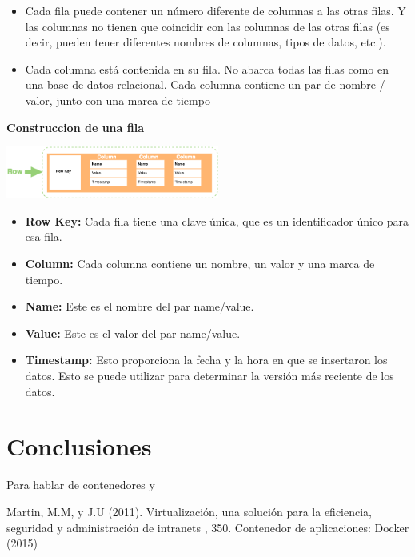 \documentclass[twoside,twocolumn]{article}
\begin{document}
\begin{itemize}	

	\item Cada fila  puede contener un número diferente de columnas a las otras filas. Y las columnas no tienen que coincidir con las columnas de las otras filas (es decir, pueden tener diferentes nombres de columnas, tipos de datos, etc.).
	\item Cada columna  está contenida en su fila. No abarca todas las filas como en una base de datos relacional. Cada columna contiene un par de nombre / valor, junto con una marca de tiempo

\end{itemize} 

\textbf{Construccion de una fila}
\begin{center}
	\includegraphics[width=7cm]{./Imagenes/row} 
\end{center}
\begin{itemize}	

	\item \textbf{Row Key:} Cada fila tiene una clave única, que es un identificador único para esa fila.
	\item \textbf{Column:} Cada columna contiene un nombre, un valor y una marca de tiempo.
	\item \textbf {Name:} Este es el nombre del par name/value.
	\item \textbf{Value:} Este es el valor del par name/value.
	\item \textbf{Timestamp:} Esto proporciona la fecha y la hora en que se insertaron los datos. Esto se puede utilizar para determinar la versión más reciente de los datos.
\end{itemize} 


\section{Conclusiones}

Para hablar de contenedores y

\begin{thebibliography}{99} %

Martin, M.M,  y J.U (2011).
\newblock Virtualización, una solución para la eficiencia,
seguridad y administración de intranets
, 350.
\newblock Contenedor de aplicaciones: Docker (2015)
 
 
\end{thebibliography}

\end{document}
